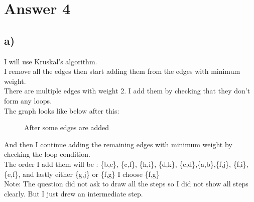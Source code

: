 \documentclass[12pt]{article}
\begin{document}
\section*{Answer 4}
\subsection*{a) }
I will use Kruskal's algorithm.\\
I remove all the edges then start adding them from the edges with minimum weight.\\
There are multiple edges with weight 2. I add them by checking that they don't form any loops.\\
The graph looks like below after this:\\
\begin{figure}[H]
	\centering
	\caption{After some edges are added}	
	\label{fig:g4}
\end{figure}
And then I continue adding the remaining edges with minimum weight by checking the loop condition.\\
The order I add them will be : \{b,c\}, \{c,f\}, \{h,i\}, \{d,k\}, \{c,d\},\{a,b\},\{f,j\}, \{f,i\}, \{e,f\}, and lastly either \{g,j\} or \{f,g\} I choose \{f,g\} \\
Note: The question did not ask to draw all the steps so I did not show all steps clearly. But I just drew an intermediate step.
\end{document}
